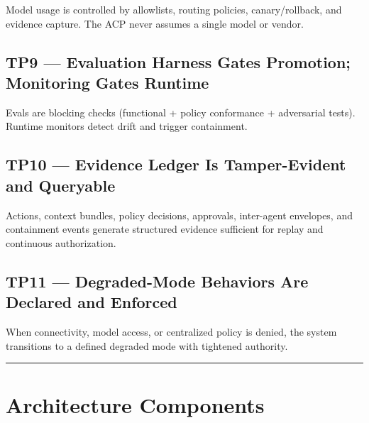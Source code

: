 \documentclass[11pt]{article}
\begin{document}
Model usage is controlled by allowlists, routing policies,
canary/rollback, and evidence capture. The ACP never assumes a single
model or vendor.

\hypertarget{tp9-evaluation-harness-gates-promotion-monitoring-gates-runtime}{%
\subsection{TP9 --- Evaluation Harness Gates Promotion; Monitoring Gates Runtime}\label{tp9-evaluation-harness-gates-promotion-monitoring-gates-runtime}}

Evals are blocking checks (functional + policy conformance + adversarial
tests). Runtime monitors detect drift and trigger containment.

\hypertarget{tp10-evidence-ledger-is-tamper-evident-and-queryable}{%
\subsection{TP10 --- Evidence Ledger Is Tamper-Evident and Queryable}\label{tp10-evidence-ledger-is-tamper-evident-and-queryable}}

Actions, context bundles, policy decisions, approvals, inter-agent
envelopes, and containment events generate structured evidence
sufficient for replay and continuous authorization.

\hypertarget{tp11-degraded-mode-behaviors-are-declared-and-enforced}{%
\subsection{TP11 --- Degraded-Mode Behaviors Are Declared and Enforced}\label{tp11-degraded-mode-behaviors-are-declared-and-enforced}}

When connectivity, model access, or centralized policy is denied, the
system transitions to a defined degraded mode with tightened authority.

\vspace{2pt}\begin{center}\rule{0.62\linewidth}{0.6pt}\end{center}\vspace{2pt}

\hypertarget{architecture-components}{%
\section{Architecture Components}\label{architecture-components}}
\end{document}
